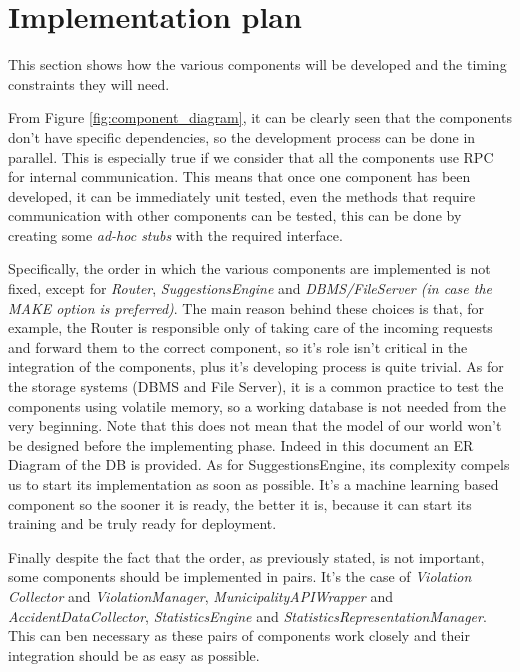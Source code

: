 \section{Implementation plan}
This section shows how the various components will be developed
and the timing constraints they will need. 

From Figure \ref{fig:component_diagram}, it can be clearly seen that the
components don't have specific dependencies, so the development process can be
done in parallel. This is especially true if we consider that all the components
use RPC for internal communication. This means that once one component has been
developed, it can be immediately unit tested, even the methods that require
communication with other components can be tested, this can be done by creating
some \emph{ad-hoc stubs} with the required interface.

Specifically, the order in which the various components are implemented is not
fixed, except for \emph{Router}, \emph{SuggestionsEngine} and
\emph{DBMS/FileServer (in case the MAKE option is preferred)}. The main reason
behind these choices is that, for example, the Router is responsible only of
taking care of the incoming requests and forward them to the correct component,
so it's role isn't critical in the integration of the components, plus it's
developing process is quite trivial. As for the storage systems (DBMS and File
Server), it is a common practice to test the components using volatile memory,
so a working database is not needed from the very beginning. Note that this does
not mean that the model of our world won't be designed before the implementing
phase. Indeed in this document an ER Diagram of the DB is provided. As for
SuggestionsEngine, its complexity compels us to start its implementation as soon
as possible. It's a machine learning based component so the sooner it is ready,
the better it is, because it can start its training and be truly ready for
deployment.

Finally despite the fact that the order, as previously stated, is not important,
some components should be implemented in pairs. It's the case of \emph{Violation
Collector} and \emph{ViolationManager}, \emph{MunicipalityAPIWrapper} and
\emph{AccidentDataCollector}, \emph{StatisticsEngine} and
\emph{StatisticsRepresentationManager}. This can ben necessary as these pairs of
components work closely and their integration should be as easy as possible.